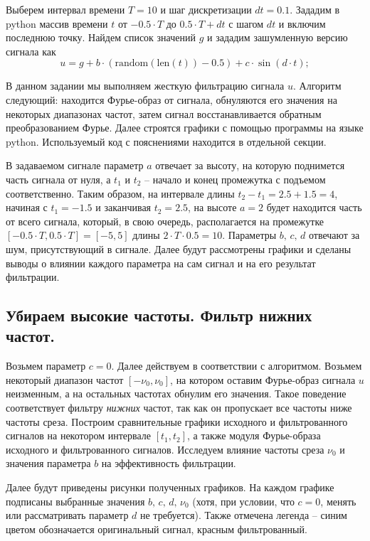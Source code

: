 \documentclass[a4paper, 12pt]{article}
\begin{document}
    Выберем интервал времени $T=10$ и шаг дискретизации $dt=0.1$. Зададим в python массив времени $t$ от $-0.5\cdot T$ до $0.5\cdot T+dt$
    с шагом $dt$ и включим последнюю точку. Найдем список значений $g$ и зададим зашумленную версию сигнала как
    $$
    u=g+b\cdot(\text{random}(\text{len}(t))-0.5) + c\cdot \sin(d\cdot t);
    $$


    В данном задании мы выполняем жесткую фильтрацию сигнала $u$. Алгоритм следующий: находится Фурье-образ от сигнала,
    обнуляются его значения на некоторых диапазонах частот, затем сигнал восстанавливается обратным преобразованием Фурье.
    Далее строятся графики с помощью программы на языке python. Используемый код с пояснениями находится в отдельной секции.


    В задаваемом сигнале параметр $a$ отвечает за высоту, на которую поднимется часть сигнала от нуля, а $t_1 \text{ и } t_2$ -- начало
    и конец промежутка с подъемом соответственно. Таким образом, на интервале длины $t_2-t_1=2.5+1.5=4$, начиная с $t_1=-1.5$ и заканчивая $t_2=2.5$,
    на высоте $a=2$ будет находится часть от всего сигнала, который, в свою очередь, располагается на промежутке $[-0.5\cdot T,0.5\cdot T]=[-5,5]$
    длины $2\cdot T\cdot 0.5=10$. Параметры $b,\,c,\,d$ отвечают за шум, присутствующий в сигнале. Далее будут рассмотрены графики и сделаны выводы о
    влиянии каждого параметра на сам сигнал и на его результат фильтрации.


    \subsection{Убираем высокие частоты. Фильтр нижних частот.}
    Возьмем параметр $c=0$. Далее действуем в соответствии с алгоритмом. Возьмем некоторый диапазон частот $[-\nu_0, \nu_0]$, на котором оставим Фурье-образ
    сигнала $u$ неизменным, а на остальных частотах обнулим его значения. Такое поведение соответствует фильтру \textit{нижних} частот, так как он пропускает
    все частоты ниже частоты среза. Построим сравнительные графики исходного и фильтрованного сигналов на некотором интервале $[t_1,t_2]$, а также модуля
    Фурье-образа исходного и фильтрованного сигналов. Исследуем влияние частоты среза $\nu_0$ и значения параметра $b$ на эффективность фильтрации.
    
    
    Далее будут приведены рисунки полученных графиков. На каждом графике подписаны выбранные значения $b,\,c,\,d,\,\nu_0$
    (хотя, при условии, что $c=0$, менять или рассматривать параметр $d$ не требуется). Также отмечена легенда -- синим цветом
    обозначается оригинальный сигнал, красным фильтрованный.
\end{document}
